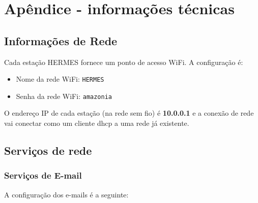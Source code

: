 \documentclass[11pt,a4paper]{article}
\begin{document}



\pagebreak
{}
\label{techinfo}
\section{Apêndice - informações técnicas}
\subsection{Informações de Rede}
\label{apx_net_info}

Cada estação HERMES fornece um ponto de acesso WiFi. A configuração é:

\begin{itemize}
\item Nome da rede WiFi: \texttt{HERMES}
\item Senha da rede WiFi: \texttt{amazonia}
\end{itemize}

O endereço IP de cada estação (na rede sem fio) é \textbf{10.0.0.1} e a conexão de rede vai conectar como um cliente dhcp a uma rede já existente.


\subsection{Serviços de rede} 
\label{apx_net_services}

\subsubsection{Serviços de E-mail}
\label{apx_net_email}

A configuração dos e-mails é a seguinte:
\end{document}

